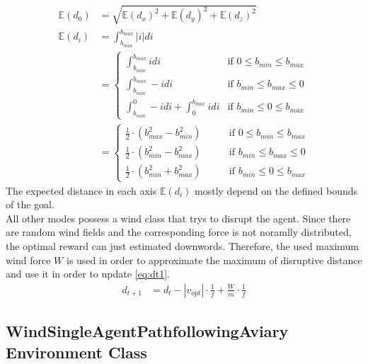 \begin{align}
	\mathbb{E}(d_0) &= \sqrt{\mathbb{E}(d_x)^2 + \mathbb{E}(d_y)^2 + \mathbb{E}(d_z)^2} \\
	\mathbb{E}(d_i) &= \int_{b_{min}}^{b_{max}} |i| di \\
	&= 
	\left\{
	\begin{array}{ll}
		 \int_{b_{min}}^{b_{max}} i di & \mbox{if } 0 \leq b_{min} \leq b_{max} \\
		 \int_{b_{min}}^{b_{max}} -i di & \mbox{if } b_{min} \leq b_{max} \leq 0\\
		\int_{b_{min}}^{0} -i di + \int_{0}^{b_{max}} i di  & \mbox{if } b_{min} \leq 0 \leq b_{max}
	\end{array}
	\right. \\
	&=
	\left\{
	\begin{array}{ll}
		\frac{1}{2} \cdot (b_{max}^2 - b_{min}^2) \enspace \enspace \enspace \enspace  & \mbox{if } 0 \leq b_{min} \leq b_{max} \\
		\frac{1}{2} \cdot (b_{min}^2 - b_{max}^2)  & \mbox{if } b_{min} \leq b_{max} \leq 0\\
		\frac{1}{2} \cdot (b_{min}^2 + b_{max}^2) & \mbox{if } b_{min} \leq 0 \leq b_{max}
	\end{array}
	\right.
	\label{eq:expd}
\end{align}
The expected distance in each axis $\mathbb{E}(d_i)$ mostly depend on the defined bounds of the goal.\\
\newline
All other modes possess a wind class that trys to disrupt the agent. Since there are random wind fields and the corresponding force is not noramlly distributed, the optimal reward can just estimated downwords. Therefore, the used maximum wind force $W$ is used in order to approximate the maximum of disruptive distance and use it in order to update \cref{eq:dt1}.
\begin{align}
	d_{t+1} &= d_t - | v_{opt} | \cdot \frac{1}{f} + \frac{W}{m} \cdot \frac{1}{f}
\end{align}
\newpage

\subsection{WindSingleAgentPathfollowingAviary Environment Class}


